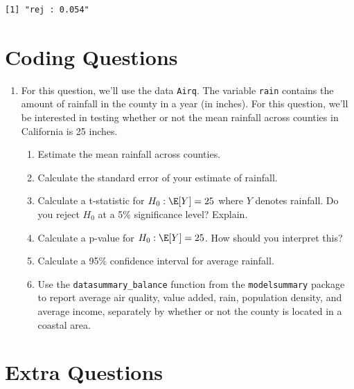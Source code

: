 \documentclass[
  letterpaper,
  DIV=11,
  numbers=noendperiod]{scrreprt}
\begin{document}
\begin{verbatim}
[1] "rej : 0.054"
\end{verbatim}

\section{Coding Questions}\label{coding-questions-1}

\begin{enumerate}
\def\labelenumi{\arabic{enumi}.}
\item
  For this question, we'll use the data \texttt{Airq}. The variable
  \texttt{rain} contains the amount of rainfall in the county in a year
  (in inches). For this question, we'll be interested in testing whether
  or not the mean rainfall across counties in California is 25 inches.

  \begin{enumerate}
  \def\labelenumii{\alph{enumii})}
  \item
    Estimate the mean rainfall across counties.
  \item
    Calculate the standard error of your estimate of rainfall.
  \item
    Calculate a t-statistic for \(H_0 : \E[Y] = 25\) where \(Y\) denotes
    rainfall. Do you reject \(H_0\) at a 5\% significance level?
    Explain.
  \item
    Calculate a p-value for \(H_0: \E[Y] = 25\). How should you
    interpret this?
  \item
    Calculate a 95\% confidence interval for average rainfall.
  \item
    Use the \texttt{datasummary\_balance} function from the
    \texttt{modelsummary} package to report average air quality, value
    added, rain, population density, and average income, separately by
    whether or not the county is located in a coastal area.
  \end{enumerate}
\end{enumerate}

\section{Extra Questions}\label{extra-questions-1}
\end{document}
